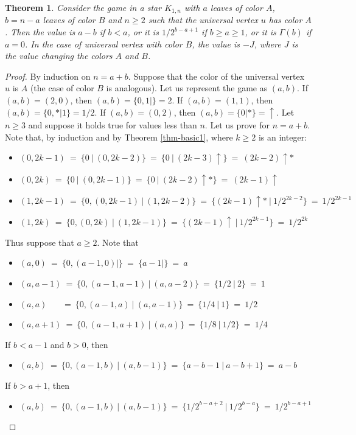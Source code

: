 \documentclass[a4paper,11pt]{article}
\newtheorem{theorem}{Theorem}
\begin{document}
\begin{theorem}\label{thm-star2}
Consider the game in a star $K_{1,n}$ with $a$ leaves of color $A$, $b=n-a$ leaves of color $B$ and $n\geq 2$ such that the universal vertex $u$ has color $A$.
Then the value is $a-b$ if $b<a$, or it is $1/2^{b-a+1}$ if $b\geq a\geq 1$, or it is $\Gamma(b)$ if $a=0$.
In the case of universal vertex with color $B$, the value is $-J$, where $J$ is the value changing the colors $A$ and $B$.
\end{theorem}

\begin{proof}
By induction on $n=a+b$. Suppose that the color of the universal vertex $u$ is $A$ (the case of color $B$ is analogous). Let us represent the game as $(a,b)$. If $(a,b)=(2,0)$, then $(a,b)=\{0,1|\}=2$. If $(a,b)=(1,1)$, then $(a,b)=\{0,*|1\}=1/2$. If $(a,b)=(0,2)$, then $(a,b)=\{0|*\}=\uparrow$.
Let $n\geq 3$ and suppose it holds true for values less than $n$. Let us prove for $n=a+b$. Note that, by induction and  by Theorem \ref{thm-basic1}, where $k\geq 2$ is an integer:
\begin{itemize}
\item $(0,2k-1)\ =\ \{0\ \big|\ (0,2k-2)\}\ =\ \{0\ \big|\ (2k-3)\uparrow\}\ =\ (2k-2)\uparrow*$
\item $(0,2k)\ =\ \{0\ \big|\ (0,2k-1)\}\ =\ \{0\ \big|\ (2k-2)\uparrow*\}\ =\ (2k-1)\uparrow$
\item $(1,2k-1)\ =\ \{0, (0,2k-1)\ \big|\ (1,2k-2)\}\ =\ \{(2k-1)\uparrow*\ \big|\ 1/2^{2k-2}\}\ =\ 1/2^{2k-1}$
\item $(1,2k)\ =\ \{0, (0,2k)\ \big|\ (1,2k-1)\}\ =\ \{(2k-1)\uparrow\ \big|\ 1/2^{2k-1}\}\ =\ 1/2^{2k}$
\end{itemize}
Thus suppose that $a\geq 2$. Note that
\begin{itemize}
\item $(a,0)\ =\ \{0,(a-1,0)|\}\ =\ \{a-1|\}\ =\ a$
\item $(a,a-1)\ =\ \{0,(a-1,a-1)\ \big|\ (a,a-2)\}\ =\ \{1/2\ \big|\ 2\}\ =\ 1$
\item $(a,a)\ \ \ \ \ \ \ \ =\ \{0,(a-1,a)\ \big|\ (a,a-1)\}\ =\ \{1/4\ \big|\ 1\}\ =\ 1/2$
\item $(a,a+1)\ =\ \{0,(a-1,a+1)\ \big|\ (a,a)\}\ =\ \{1/8\ \big|\ 1/2\}\ =\ 1/4$
\end{itemize}
If $b<a-1$ and $b>0$, then
\begin{itemize}
\item $(a,b)\ =\ \{0,(a-1,b)\ \big|\ (a,b-1)\}\ =\ \{a-b-1\ \big|\ a-b+1\}\ =\ a-b$
\end{itemize}
If $b>a+1$, then
\begin{itemize}
\item $(a,b)\ =\ \{0,(a-1,b)\ \big|\ (a,b-1)\}\ =\ \{1/2^{b-a+2}\ \big|\ 1/2^{b-a}\}\ =\ 1/2^{b-a+1}$
\end{itemize}
\end{proof}
\end{document}
